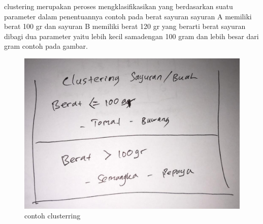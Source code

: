 \begin{enumerate}
clustering merupakan peroses mengklasifikasikan yang berdasarkan suatu parameter dalam penentuannya contoh pada berat sayuran sayuran A memiliki berat 100 gr dan sayuran B memiliki berat 120 gr yang berarti berat sayuran dibagi dua parameter yaitu lebih kecil samadengan 100 gram dan lebih besar dari gram contoh pada gambar.\par
\begin{figure}[ht]
\centering
\includegraphics[scale=0.2]{figures/1174042/chapter2/1,4.jpeg}
\caption{contoh clusterring}
\label{contoh}
\end{figure}



\end{enumerate}
